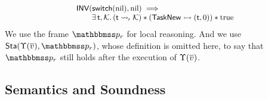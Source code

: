\[
    \small
    \begin{array}{l}
        \textsf{INV}{(\mathsf{switch}(\text{nil}), \text{nil})}
        \implies \\
        \qquad
        \exists \, \textsf{t}, \mathcal{K}. \,
        ({\textsf{t}} \leadsto_{\textsf{r}} {\mathcal{K}}) *
        ({\mathsf{TaskNew}} \rightarrowtail {(\textsf{t}, 0)})
        * \text{true}
    \end{array}
\]
We use the frame $\relastP_r$ for local reasoning. 
And we use $\Sta(\hprim(\args{\val}), \relastP_r)$, whose 
definition is omitted here, to say that $\relastP_r$
still holds after the execution of $\Upsilon(\overline{v})$.

\subsection{Semantics and Soundness}
\label{subsec:semantics and soundness}

